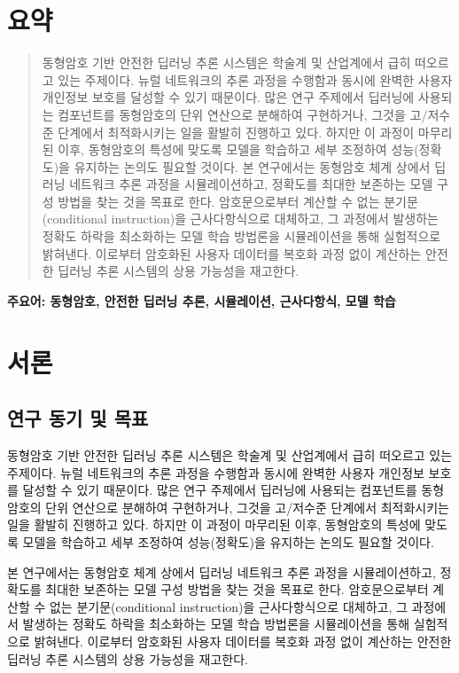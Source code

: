 \documentclass[a4paper, 11pt, chapterprefix=false]{report}
\begin{document}
\chapter*{요약}
\begin{quote}
동형암호 기반 안전한 딥러닝 추론 시스템은 학술계 및 산업계에서 급히 떠오르고
있는 주제이다. 뉴럴 네트워크의 추론 과정을 수행함과 동시에 완벽한 사용자
개인정보 보호를 달성할 수 있기 때문이다. 많은 연구 주제에서 딥러닝에 사용되는
컴포넌트를 동형암호의 단위 연산으로 분해하여 구현하거나, 그것을 고/저수준
단계에서 최적화시키는 일을 활발히 진행하고 있다. 하지만 이 과정이 마무리된 이후,
동형암호의 특성에 맞도록 모델을 학습하고 세부 조정하여 성능(정확도)을 유지하는
논의도 필요할 것이다. 본 연구에서는 동형암호 체계 상에서 딥러닝 네트워크 추론
과정을 시뮬레이션하고, 정확도를 최대한 보존하는 모델 구성 방법을 찾는 것을
목표로 한다. 암호문으로부터 계산할 수 없는 분기문(conditional instruction)을
근사다항식으로 대체하고, 그 과정에서 발생하는 정확도 하락을 최소화하는 모델 학습
방법론을 시뮬레이션을 통해 실험적으로 밝혀낸다. 이로부터 암호화된 사용자
데이터를 복호화 과정 없이 계산하는 안전한 딥러닝 추론 시스템의 상용 가능성을
재고한다.
\end{quote}

\begin{center}
  \textbf{주요어: 동형암호, 안전한 딥러닝 추론, 시뮬레이션, 근사다항식, 모델 학습}
\end{center}

\tableofcontents

\chapter{서론}

\section{연구 동기 및 목표}

동형암호 기반 안전한 딥러닝 추론 시스템은 학술계 및 산업계에서 급히 떠오르고
있는 주제이다. 뉴럴 네트워크의 추론 과정을 수행함과 동시에 완벽한 사용자
개인정보 보호를 달성할 수 있기 때문이다. 많은 연구 주제에서 딥러닝에 사용되는
컴포넌트를 동형암호의 단위 연산으로 분해하여 구현하거나, 그것을 고/저수준
단계에서 최적화시키는 일을 활발히 진행하고 있다. 하지만 이 과정이 마무리된 이후,
동형암호의 특성에 맞도록 모델을 학습하고 세부 조정하여 성능(정확도)을 유지하는
논의도 필요할 것이다.

본 연구에서는 동형암호 체계 상에서 딥러닝 네트워크 추론 과정을 시뮬레이션하고,
정확도를 최대한 보존하는 모델 구성 방법을 찾는 것을 목표로 한다. 암호문으로부터
계산할 수 없는 분기문(conditional instruction)을 근사다항식으로 대체하고, 그
과정에서 발생하는 정확도 하락을 최소화하는 모델 학습 방법론을 시뮬레이션을 통해
실험적으로 밝혀낸다. 이로부터 암호화된 사용자 데이터를 복호화 과정 없이 계산하는
안전한 딥러닝 추론 시스템의 상용 가능성을 재고한다.
\end{document}
